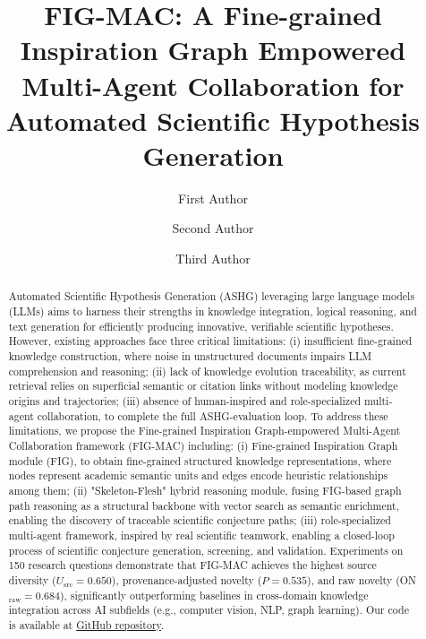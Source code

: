 \documentclass[runningheads]{llncs}
\begin{document}
\title{FIG-MAC: A Fine-grained Inspiration Graph Empowered Multi-Agent Collaboration for Automated Scientific Hypothesis Generation}


\author{First Author \and Second Author \and Third Author}



\maketitle

\begin{abstract}
Automated Scientific Hypothesis Generation (ASHG) leveraging large language models (LLMs) aims to harness their strengths in knowledge integration, logical reasoning, and text generation for efficiently producing innovative, verifiable scientific hypotheses. However, existing approaches face three critical limitations: (i) insufficient fine-grained knowledge construction, where noise in unstructured documents impairs LLM comprehension and reasoning; (ii) lack of knowledge evolution traceability, as current retrieval relies on superficial semantic or citation links without modeling knowledge origins and trajectories; (iii) absence of human-inspired and role-specialized multi-agent collaboration, to complete the full ASHG-evaluation loop. To address these limitations, we propose the Fine-grained Inspiration Graph-empowered Multi-Agent Collaboration framework (FIG-MAC) including: (i) Fine-grained Inspiration Graph module (FIG), to obtain fine-grained structured knowledge representations, where nodes represent academic semantic units and edges encode heuristic relationships among them; (ii) "Skeleton-Flesh" hybrid reasoning module, fusing FIG-based graph path reasoning as a structural backbone with vector search as semantic enrichment, enabling the discovery of traceable scientific conjecture paths; (iii) role-specialized multi-agent framework, inspired by real scientific teamwork, enabling a closed-loop process of scientific conjecture generation, screening, and validation. Experiments on 150 research questions demonstrate that FIG-MAC achieves the highest source diversity ($U_{\text{src}}=0.650$), provenance-adjusted novelty ($P=0.535$), and raw novelty (ON$_{\text{raw}}=0.684$), significantly outperforming baselines in cross-domain knowledge integration across AI subfields (e.g., computer vision, NLP, graph learning). Our code is available at \href{https://github.com/SiyuanChenToDo/KG-LLM.git}{GitHub repository}.

\end{abstract}
\end{document}
